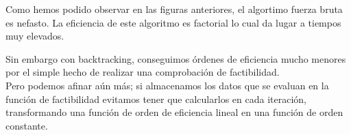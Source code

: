 \documentclass[12pt,spanish]{article}
\begin{document}
Como hemos podido observar en las figuras anteriores, el algortimo fuerza bruta es nefasto. La eficiencia de este algoritmo es factorial lo cual da lugar a tiempos muy elevados.

Sin embargo con backtracking, conseguimos órdenes de eficiencia mucho menores por el simple hecho de realizar una comprobación de factibilidad. \\

Pero podemos afinar aún más; si almacenamos los datos que se evaluan en la función de factibilidad evitamos tener que calcularlos en cada iteración, transformando una función de orden de eficiencia lineal en una función de orden constante.

\end{document}
